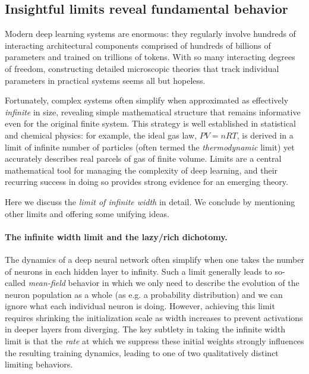 \subsection{Insightful limits reveal fundamental behavior}
\label{sec:reason-limits}


Modern deep learning systems are enormous: they regularly involve hundreds of interacting architectural components comprised of hundreds of billions of parameters and trained on trillions of tokens.
With so many interacting degrees of freedom, constructing detailed microscopic theories that track individual parameters in practical systems seems all but hopeless.

Fortunately, complex systems often simplify when approximated as effectively \emph{infinite} in size, revealing simple mathematical structure that remains informative even for the original finite system.
This strategy is well established in statistical and chemical physics: for example, the ideal gas law, $PV = nRT$, is derived in a limit of infinite number of particles (often termed the \textit{thermodynamic} limit) yet accurately describes real parcels of gas of finite volume.
Limits are a central mathematical tool for managing the complexity of deep learning, and their recurring success in doing so provides strong evidence for an emerging theory.

Here we discuss the \textit{limit of infinite width} in detail.
We conclude by mentioning other limits and offering some unifying ideas.


\paragraph{The infinite width limit and the lazy/rich dichotomy.}
The dynamics of a deep neural network often simplify when one takes the number of neurons in each hidden layer to infinity.
Such a limit generally leads to so-called \textit{mean-field} behavior in which we only need to describe the evolution of the neuron population as a whole (as e.g. a probability distribution) and we can ignore what each individual neuron is doing.
However, achieving this limit requires shrinking the initialization scale as width increases to prevent activations in deeper layers from diverging.
The key subtlety in taking the infinite width limit is that the \textit{rate} at which we suppress these initial weights strongly influences the resulting training dynamics, leading to one of two qualitatively distinct limiting behaviors.

